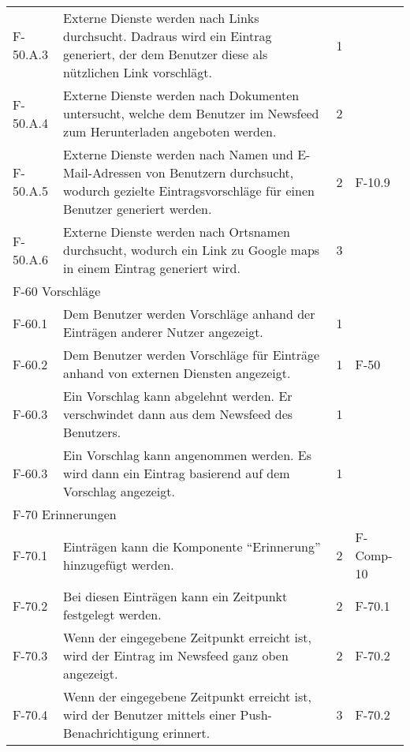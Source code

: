 \begin{tabularx}{\textwidth}{|l|X|l|l|}
    F-50.A.3 & Externe Dienste werden nach Links durchsucht. Dadraus wird ein Eintrag generiert, der dem Benutzer diese als nützlichen Link vorschlägt. & 1 & \\
    F-50.A.4 & Externe Dienste werden nach Dokumenten untersucht, welche dem Benutzer im Newsfeed zum Herunterladen angeboten werden. & 2 & \\
    F-50.A.5 & Externe Dienste werden nach Namen und E-Mail-Adressen von Benutzern durchsucht, wodurch gezielte Eintragsvorschläge für einen Benutzer generiert werden. & 2 & F-10.9 \\
    F-50.A.6 & Externe Dienste werden nach Ortsnamen durchsucht, wodurch ein Link zu Google maps in einem Eintrag generiert wird. & 3 & \\
    \hline
    \multicolumn{4}{|l|}{F-60 Vorschläge}\\
    \hline 
    F-60.1 & Dem Benutzer werden Vorschläge anhand der Einträgen anderer Nutzer angezeigt. & 1 & \\
    F-60.2 & Dem Benutzer werden Vorschläge für Einträge anhand von externen Diensten angezeigt. & 1 & F-50 \\
    F-60.3 & Ein Vorschlag kann abgelehnt werden. Er verschwindet dann aus dem Newsfeed des Benutzers. & 1 & \\
    F-60.3 & Ein Vorschlag kann angenommen werden. Es wird dann ein Eintrag basierend auf dem Vorschlag angezeigt. & 1 & \\
    \hline
    \multicolumn{4}{|l|}{F-70 Erinnerungen}\\
    F-70.1 & Einträgen kann die Komponente \enquote{Erinnerung} hinzugefügt werden. & 2 & F-Comp-10 \\
    F-70.2 & Bei diesen Einträgen kann ein Zeitpunkt festgelegt werden. & 2 & F-70.1 \\
    F-70.3 & Wenn der eingegebene Zeitpunkt erreicht ist, wird der Eintrag im Newsfeed ganz oben angezeigt. & 2 & F-70.2 \\
    F-70.4 & Wenn der eingegebene Zeitpunkt erreicht ist, wird der Benutzer mittels einer Push-Benachrichtigung erinnert. & 3 & F-70.2 \\
    \hline


\end{tabularx}
